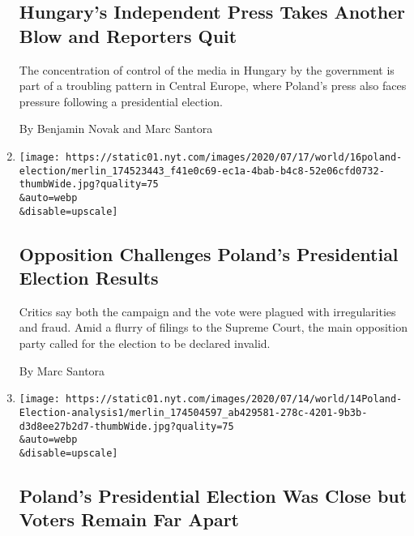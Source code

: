 \begin{enumerate}
  \hypertarget{hungarys-independent-press-takes-another-blow-and-reporters-quit}{%
  \subsection{Hungary's Independent Press Takes Another Blow and
  Reporters
  Quit}\label{hungarys-independent-press-takes-another-blow-and-reporters-quit}}

  The concentration of control of the media in Hungary by the government
  is part of a troubling pattern in Central Europe, where Poland's press
  also faces pressure following a presidential election.

  By Benjamin Novak and Marc Santora
\item
  \href{/2020/07/16/world/europe/poland-election.html}{}

  \texttt{[image: https://static01.nyt.com/images/2020/07/17/world/16poland-election/merlin\_174523443\_f41e0c69-ec1a-4bab-b4c8-52e06cfd0732-thumbWide.jpg?quality=75\\\&auto=webp\\\&disable=upscale]}

  \hypertarget{opposition-challenges-polands-presidential-election-results}{%
  \subsection{Opposition Challenges Poland's Presidential Election
  Results}\label{opposition-challenges-polands-presidential-election-results}}

  Critics say both the campaign and the vote were plagued with
  irregularities and fraud. Amid a flurry of filings to the Supreme
  Court, the main opposition party called for the election to be
  declared invalid.

  By Marc Santora
\item
  \href{/2020/07/14/world/europe/poland-election-court-challenge.html}{}

  \texttt{[image: https://static01.nyt.com/images/2020/07/14/world/14Poland-Election-analysis1/merlin\_174504597\_ab429581-278c-4201-9b3b-d3d8ee27b2d7-thumbWide.jpg?quality=75\\\&auto=webp\\\&disable=upscale]}

  \hypertarget{polands-presidential-election-was-close-but-voters-remain-far-apart}{%
  \subsection{Poland's Presidential Election Was Close but Voters Remain
  Far
  Apart}\label{polands-presidential-election-was-close-but-voters-remain-far-apart}}


\end{enumerate}
